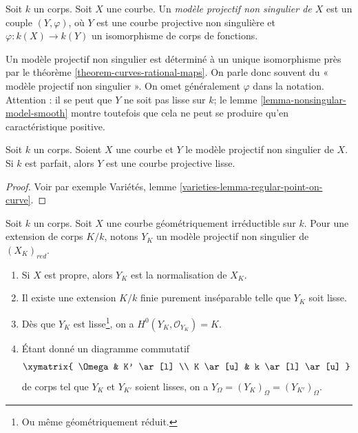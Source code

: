 \begin{definition}
\label{definition-normal-projective-model}
Soit $k$ un corps. Soit $X$ une courbe. Un {\it modèle projectif non singulier de $X$} est un couple $(Y, \varphi)$, où $Y$ est une courbe projective non singulière et $\varphi : k(X) \to k(Y)$ un isomorphisme de corps de fonctions.
\end{definition}

\noindent
Un modèle projectif non singulier est déterminé à un unique isomorphisme près par le théorème \ref{theorem-curves-rational-maps}. On parle donc souvent du « modèle projectif non singulier ». On omet généralement $\varphi$ dans la notation. Attention : il se peut que $Y$ ne soit pas lisse sur $k$; le lemme \ref{lemma-nonsingular-model-smooth} montre toutefois que cela ne peut se produire qu'en caractéristique positive.

\begin{lemma}
\label{lemma-nonsingular-model-smooth}
Soit $k$ un corps. Soient $X$ une courbe et $Y$ le modèle projectif non singulier de $X$. Si $k$ est parfait, alors $Y$ est une courbe projective lisse.
\end{lemma}

\begin{proof}
Voir par exemple Variétés, lemme \ref{varieties-lemma-regular-point-on-curve}.
\end{proof}

\begin{lemma}
\label{lemma-smooth-models}
Soit $k$ un corps. Soit $X$ une courbe géométriquement irréductible sur $k$. Pour une extension de corps $K/k$, notons $Y_K$ un modèle projectif non singulier de $(X_K)_{red}$. \begin{enumerate} \item Si $X$ est propre, alors $Y_K$ est la normalisation de $X_K$. \item Il existe une extension $K/k$ finie purement inséparable telle que $Y_K$ soit lisse. \item Dès que $Y_K$ est lisse\footnote{Ou même géométriquement réduit.}, on a $H^0(Y_K, \mathcal{O}_{Y_K}) = K$. \item Étant donné un diagramme commutatif $$
\xymatrix{
\Omega & K' \ar[l] \\
K \ar[u] & k \ar[l] \ar[u]
}
$$ de corps tel que $Y_K$ et $Y_{K'}$ soient lisses, on a $Y_\Omega = (Y_K)_\Omega = (Y_{K'})_\Omega$.
\end{enumerate}
\end{lemma}

